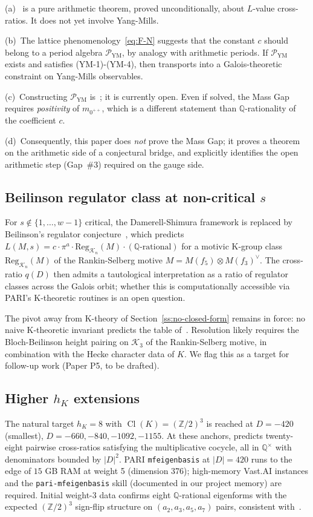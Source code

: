 \documentclass[11pt]{amsart}
\theoremstyle{definition}
\theoremstyle{remark}
\DeclareMathOperator{\Cl}{Cl}
\newcommand{\Q}{\mathbb{Q}}
\newcommand{\Z}{\mathbb{Z}}
\begin{document}
(a)~ is a pure arithmetic theorem, proved unconditionally,
about $L$-value cross-ratios. It does not yet involve Yang-Mills.

(b)~The lattice phenomenology~\eqref{eq:F-N} suggests that the constant
$c$ should belong to a period algebra $\mathcal{P}_{\mathrm{YM}}$, by
analogy with arithmetic periods. If $\mathcal{P}_{\mathrm{YM}}$
exists and satisfies (YM-1)-(YM-4), then  transports
into a Galois-theoretic constraint on Yang-Mills observables.

(c)~Constructing $\mathcal{P}_{\mathrm{YM}}$ is~;
it is currently open. Even if solved, the Mass Gap requires
\emph{positivity} of $m_{0^{++}}$, which is a different statement than
$\Q$-rationality of the coefficient $c$.

(d)~Consequently, this paper does \emph{not} prove the Mass Gap; it
proves a theorem on the arithmetic side of a conjectural bridge, and
explicitly identifies the open arithmetic step (Gap~\#3) required
on the gauge side.

\subsection{Beilinson regulator class at non-critical $s$}\label{ss:beilinson}
For $s \notin \{1, \dots, w - 1\}$ critical, the Damerell-Shimura
framework is replaced by Beilinson's regulator
conjecture~\cite{Beilinson1985}, which predicts
$L(M, s) = c \cdot \pi^a \cdot \mathrm{Reg}_{\mathcal{K}_n}(M)
\cdot (\Q\text{-rational})$ for a motivic K-group class
$\mathrm{Reg}_{\mathcal{K}_n}(M)$ of the Rankin-Selberg motive
$M = M(f_5) \otimes M(f_3)^\vee$. The cross-ratio $q(D)$ then admits
a tautological interpretation as a ratio of regulator classes across
the Galois orbit; whether this is computationally accessible via
PARI's K-theoretic routines is an open question.

The pivot away from K-theory of Section~\ref{ss:no-closed-form}
remains in force: no naive K-theoretic invariant predicts the table
of~. Resolution likely requires the Bloch-Beilinson
height pairing on $\mathcal{K}_3$ of the Rankin-Selberg motive, in
combination with the Hecke character data of $K$. We flag this as a
target for follow-up work (Paper P5, to be drafted).

\subsection{Higher $h_K$ extensions}\label{ss:higher-h}
The natural target $h_K = 8$ with $\Cl(K) = (\Z/2)^3$ is reached at
$D = -420$ (smallest), $D = -660, -840, -1092, -1155$. At these
anchors,  predicts twenty-eight pairwise cross-ratios
satisfying the multiplicative cocycle, all in $\Q^\times$ with
denominators bounded by $|D|^2$. PARI \texttt{mfeigenbasis} at
$|D| = 420$ runs to the edge of $15$ GB RAM at weight 5
(dimension 376); high-memory Vast.AI instances and the
\texttt{pari-mfeigenbasis} skill (documented in our project memory)
are required. Initial weight-3 data confirms eight $\Q$-rational
eigenforms with the expected $(\Z/2)^3$ sign-flip structure
on $(a_2, a_3, a_5, a_7)$ pairs, consistent with~.
\end{document}
